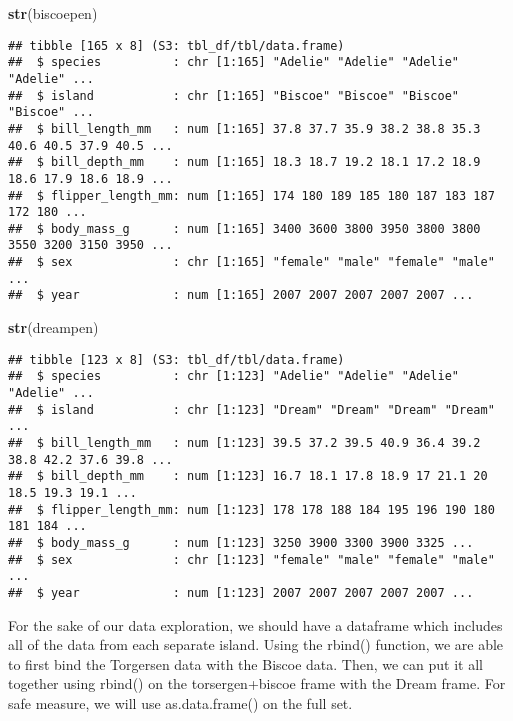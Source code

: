 \documentclass[
]{article}
\newenvironment{Shaded}{\begin{snugshade}}{\end{snugshade}}
\newcommand{\FunctionTok}[1]{\textcolor[rgb]{0.13,0.29,0.53}{\textbf{#1}}}
\newcommand{\NormalTok}[1]{#1}
\begin{document}
\begin{Shaded}
\begin{Highlighting}[]
\FunctionTok{str}\NormalTok{(biscoepen)}
\end{Highlighting}
\end{Shaded}

\begin{verbatim}
## tibble [165 x 8] (S3: tbl_df/tbl/data.frame)
##  $ species          : chr [1:165] "Adelie" "Adelie" "Adelie" "Adelie" ...
##  $ island           : chr [1:165] "Biscoe" "Biscoe" "Biscoe" "Biscoe" ...
##  $ bill_length_mm   : num [1:165] 37.8 37.7 35.9 38.2 38.8 35.3 40.6 40.5 37.9 40.5 ...
##  $ bill_depth_mm    : num [1:165] 18.3 18.7 19.2 18.1 17.2 18.9 18.6 17.9 18.6 18.9 ...
##  $ flipper_length_mm: num [1:165] 174 180 189 185 180 187 183 187 172 180 ...
##  $ body_mass_g      : num [1:165] 3400 3600 3800 3950 3800 3800 3550 3200 3150 3950 ...
##  $ sex              : chr [1:165] "female" "male" "female" "male" ...
##  $ year             : num [1:165] 2007 2007 2007 2007 2007 ...
\end{verbatim}

\begin{Shaded}
\begin{Highlighting}[]
\FunctionTok{str}\NormalTok{(dreampen)}
\end{Highlighting}
\end{Shaded}

\begin{verbatim}
## tibble [123 x 8] (S3: tbl_df/tbl/data.frame)
##  $ species          : chr [1:123] "Adelie" "Adelie" "Adelie" "Adelie" ...
##  $ island           : chr [1:123] "Dream" "Dream" "Dream" "Dream" ...
##  $ bill_length_mm   : num [1:123] 39.5 37.2 39.5 40.9 36.4 39.2 38.8 42.2 37.6 39.8 ...
##  $ bill_depth_mm    : num [1:123] 16.7 18.1 17.8 18.9 17 21.1 20 18.5 19.3 19.1 ...
##  $ flipper_length_mm: num [1:123] 178 178 188 184 195 196 190 180 181 184 ...
##  $ body_mass_g      : num [1:123] 3250 3900 3300 3900 3325 ...
##  $ sex              : chr [1:123] "female" "male" "female" "male" ...
##  $ year             : num [1:123] 2007 2007 2007 2007 2007 ...
\end{verbatim}

For the sake of our data exploration, we should have a dataframe which
includes all of the data from each separate island. Using the rbind()
function, we are able to first bind the Torgersen data with the Biscoe
data. Then, we can put it all together using rbind() on the
torsergen+biscoe frame with the Dream frame. For safe measure, we will
use as.data.frame() on the full set.
\end{document}
